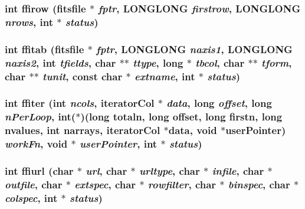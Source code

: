 \subsubsection{\setlength{\rightskip}{0pt plus 5cm}int ffirow (\bf{fitsfile} $\ast$ {\em fptr}, \bf{LONGLONG} {\em firstrow}, \bf{LONGLONG} {\em nrows}, int $\ast$ {\em status})}\label{fitsio_8h_cc0bcaad639ee0a73351ad70a6079504}


\subsubsection{\setlength{\rightskip}{0pt plus 5cm}int ffitab (\bf{fitsfile} $\ast$ {\em fptr}, \bf{LONGLONG} {\em naxis1}, \bf{LONGLONG} {\em naxis2}, int {\em tfields}, char $\ast$$\ast$ {\em ttype}, long $\ast$ {\em tbcol}, char $\ast$$\ast$ {\em tform}, char $\ast$$\ast$ {\em tunit}, const char $\ast$ {\em extname}, int $\ast$ {\em status})}\label{fitsio_8h_b6becfd4402c4a582805481af85095db}


\subsubsection{\setlength{\rightskip}{0pt plus 5cm}int ffiter (int {\em ncols}, \bf{iterator\-Col} $\ast$ {\em data}, long {\em offset}, long {\em n\-Per\-Loop}, int($\ast$)(long totaln, long offset, long firstn, long nvalues, int narrays, \bf{iterator\-Col} $\ast$data, void $\ast$user\-Pointer) {\em work\-Fn}, void $\ast$ {\em user\-Pointer}, int $\ast$ {\em status})}\label{fitsio_8h_5629227f131024fb0f7cba79d91b9929}


\subsubsection{\setlength{\rightskip}{0pt plus 5cm}int ffiurl (char $\ast$ {\em url}, char $\ast$ {\em urltype}, char $\ast$ {\em infile}, char $\ast$ {\em outfile}, char $\ast$ {\em extspec}, char $\ast$ {\em rowfilter}, char $\ast$ {\em binspec}, char $\ast$ {\em colspec}, int $\ast$ {\em status})}\label{fitsio_8h_841d8003c651737bdaaf3df7507a3691}


